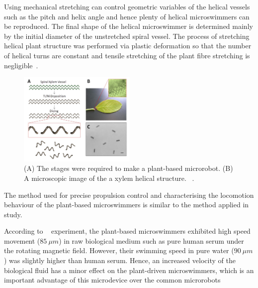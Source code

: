 \documentclass[12pt,a4paper,titlepage]{report}
\newcommand{\hilight}[1]{\colorbox{yellow}{#1}}
\begin{document}
Using mechanical stretching can control geometric variables of the helical vessels such as the pitch and
 helix angle and hence plenty of helical microswimmers can be reproduced. The final shape of the 
helical microswimmer is determined mainly by the initial diameter of the unstretched spiral vessel. The
 process of stretching helical plant structure was performed via plastic deformation so that the number 
of helical turns are constant and tensile stretching of the plant fibre stretching is negligible~\citep{mahoney2011velocity}. 


\begin{figure}
  \begin{center}
    \includegraphics[width=0.5\textwidth]{plants2}
  \caption{(A) The stages were required to make a plant-based microrobot. (B) A microscopic image of the 
a xylem helical structure. ~\citep{gao2013bioinspired}.}
  \label{plants2}
\end{center}
\end{figure}


The method used for precise propulsion control and characterising the locomotion behaviour of the 
plant-based microswimmers is similar to the method applied in \citeauthor{gao2013bioinspired} study.

According to \citeauthor{gao2013bioinspired} ~\citep{gao2013bioinspired} experiment, the plant-based 
microswimmers exhibited high speed movement ($85~\mu m$) in raw biological medium such as 
pure human serum under the rotating magnetic field. However, their swimming speed in pure water
 ($90~\mu m$) was slightly higher than human serum.   
 Hence, an increased velocity of the 
biological fluid has a minor effect on the plant-driven microswimmers, which is an important 
advantage of this microdevice over the common microrobots%
\end{document}
